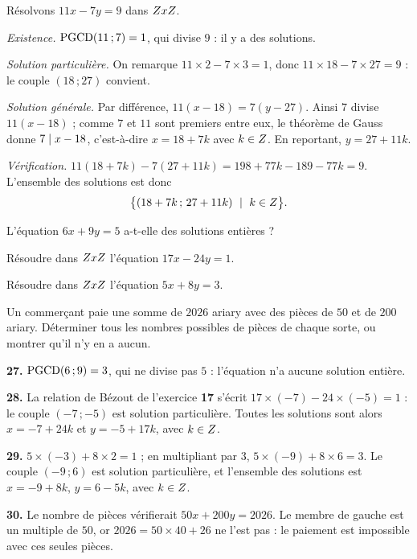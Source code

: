 \begin{exemple}
Résolvons $11x-7y = 9$ dans $ZxZ$.

\smallskip
\emph{Existence.} $\operatorname{PGCD}(11\,;7) = 1$, qui divise $9$ : il y a des solutions.

\smallskip
\emph{Solution particulière.} On remarque $11\times2-7\times3 = 1$, donc
$11\times18-7\times27 = 9$ : le couple $(18\,;27)$ convient.

\smallskip
\emph{Solution générale.} Par différence,
$11(x-18) = 7(y-27)$. Ainsi $7$ divise $11(x-18)$ ; comme $7$ et $11$ sont
premiers entre eux, le théorème de Gauss donne $7 \mid x-18$, c'est-à-dire
$x = 18+7k$ avec $k \in Z$. En reportant, $y = 27+11k$.

\smallskip
\emph{Vérification.} $11(18+7k)-7(27+11k) = 198+77k-189-77k = 9$. L'ensemble
des solutions est donc
\[
  \bigl\{(18+7k\,;\,27+11k) \ \mid \ k \in Z\bigr\}.
\]
\end{exemple}

\begin{entrainement}
\exo[\niveau{1}] L'équation $6x+9y = 5$ a-t-elle des solutions entières ?

\exo[\niveau{2}] Résoudre dans $ZxZ$ l'équation $17x-24y = 1$.

\exo[\niveau{2}] Résoudre dans $ZxZ$ l'équation $5x+8y = 3$.

\exo[\niveau{3}] Un commerçant paie une somme de $2026$ ariary avec des
pièces de $50$ et de $200$ ariary. Déterminer tous les nombres possibles de
pièces de chaque sorte, ou montrer qu'il n'y en a aucun.
\end{entrainement}

\begin{corrige}
\textbf{27.} $\operatorname{PGCD}(6\,;9) = 3$, qui ne divise pas $5$ : l'équation n'a
aucune solution entière.

\textbf{28.} La relation de Bézout de l'exercice \textbf{17} s'écrit
$17\times(-7)-24\times(-5) = 1$ : le couple $(-7\,;-5)$ est solution
particulière. Toutes les solutions sont alors
$x = -7+24k$ et $y = -5+17k$, avec $k \in Z$.

\textbf{29.} $5\times(-3)+8\times2 = 1$ ; en multipliant par $3$,
$5\times(-9)+8\times6 = 3$. Le couple $(-9\,;6)$ est solution particulière, et
l'ensemble des solutions est $x = -9+8k$, $y = 6-5k$, avec $k \in Z$.

\textbf{30.} Le nombre de pièces vérifierait $50x+200y = 2026$. Le membre de
gauche est un multiple de $50$, or $2026 = 50\times40+26$ ne l'est pas : le
paiement est impossible avec ces seules pièces.
\end{corrige}

